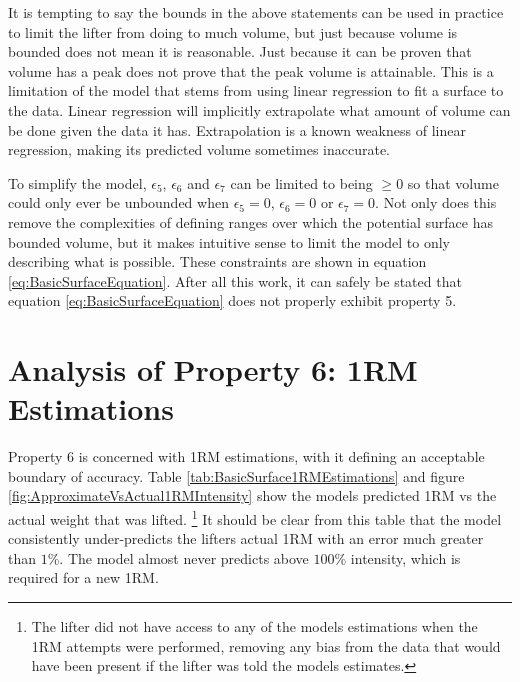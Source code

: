 It is tempting to say the bounds in the above statements can be used in practice to limit the lifter from doing to much volume, but just because volume is bounded does not mean it is reasonable. Just because it can be proven that volume has a peak does not prove that the peak volume is attainable. This is a limitation of the model that stems from using linear regression to fit a surface to the data. Linear regression will implicitly extrapolate what amount of volume can be done given the data it has. Extrapolation is a known weakness of linear regression, making its predicted volume sometimes inaccurate.

To simplify the model, $\epsilon_5$, $\epsilon_6$ and $\epsilon_7$ can be limited to being $\ge 0$ so that volume could only ever be unbounded when $\epsilon_5=0$, $\epsilon_6=0$ or $\epsilon_7=0$. Not only does this remove the complexities of defining ranges over which the potential surface has bounded volume, but it makes intuitive sense to limit the model to only describing what is possible. These constraints are shown in equation \ref{eq:BasicSurfaceEquation}. After all this work, it can safely be stated that equation \ref{eq:BasicSurfaceEquation} does not properly exhibit property 5.

\section{Analysis of Property 6: 1RM Estimations}
\label{sec:PotentialSurface1RMEstimations}

Property 6 is concerned with 1RM estimations, with it defining an acceptable boundary of accuracy. Table \ref{tab:BasicSurface1RMEstimations} and figure \ref{fig:ApproximateVsActual1RMIntensity} show the models predicted 1RM vs the actual weight that was lifted. \footnote{The lifter did not have access to any of the models estimations when the 1RM attempts were performed, removing any bias from the data that would have been present if the lifter was told the models estimates.} It should be clear from this table that the model consistently under-predicts the lifters actual 1RM with an error much greater than $1\%$. The model almost never predicts above $100\%$ intensity, which is required for a new 1RM.

